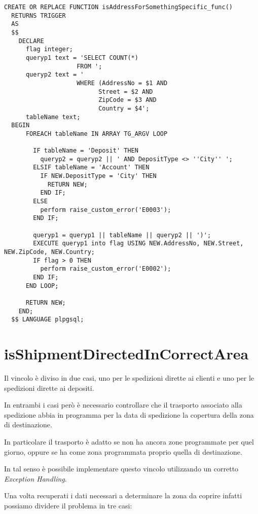 \newpage
\begin{lstlisting}[caption={Creazione della funzione \textbf{isAddressForSomethingSpecific\_func}}]
  CREATE OR REPLACE FUNCTION isAddressForSomethingSpecific_func()
  RETURNS TRIGGER
  AS 
  $$
    DECLARE 
      flag integer;
      queryp1 text = 'SELECT COUNT(*) 
                    FROM ';
      queryp2 text = ' 
                    WHERE (AddressNo = $1 AND 
                          Street = $2 AND 
                          ZipCode = $3 AND  
                          Country = $4';
      tableName text;
  BEGIN
      FOREACH tableName IN ARRAY TG_ARGV LOOP
  
        IF tableName = 'Deposit' THEN
          queryp2 = queryp2 || ' AND DepositType <> ''City'' ';
        ELSIF tableName = 'Account' THEN
          IF NEW.DepositType = 'City' THEN
            RETURN NEW;
          END IF;
        ELSE 
          perform raise_custom_error('E0003');
        END IF;
            
        queryp1 = queryp1 || tableName || queryp2 || ')';
        EXECUTE queryp1 into flag USING NEW.AddressNo, NEW.Street, NEW.ZipCode, NEW.Country;
        IF flag > 0 THEN
          perform raise_custom_error('E0002');
        END IF;
      END LOOP;
  
      RETURN NEW;
    END;
  $$ LANGUAGE plpgsql;
\end{lstlisting}

\newpage

\section{\textbf{isShipmentDirectedInCorrectArea}}

Il vincolo è diviso in due casi, uno per le spedizioni dirette ai clienti e uno per le spedizioni dirette ai depositi.

In entrambi i casi però è necessario controllare che il trasporto associato alla spedizione abbia in programma per la data di spedizione la copertura della zona di destinazione.

In particolare il trasporto è adatto se non ha ancora zone programmate per quel giorno, oppure se ha come zona programmata proprio quella di destinazione.

In tal senso è possibile implementare questo vincolo utilizzando un corretto \textit{Exception Handling}.

Una volta recuperati i dati necessari a determinare la zona da coprire infatti possiamo dividere il problema in tre casi:

